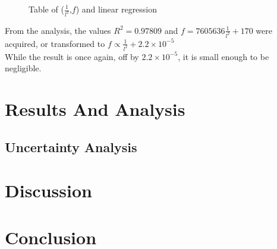 \documentclass[a4paper,12pt]{article}
\begin{document}
    \begin{figure}[H]%
    \begin{center}

    \caption{Table of ($\frac{1}{l^{2}}$,$f$) and linear regression}\label{fig:EXPregression}
    \end{center}
    \end{figure}
    From the analysis, the values $R^2=0.97809$ and $f=7605636\frac{1}{l^{2}}+170$ were acquired, or transformed to $f\propto\frac{1}{l^{2}}+2.2\times10^{-5}$\\
    While the result is once again, off by $2.2\times10^{-5}$, it is small enough to be negligible.

\section{Results And Analysis}\label{ResultsAnalysis}%
    \subsection{Uncertainty Analysis}
\section{Discussion}%
\section{Conclusion}%

\pagebreak
{}
\printbibliography
\end{document}

